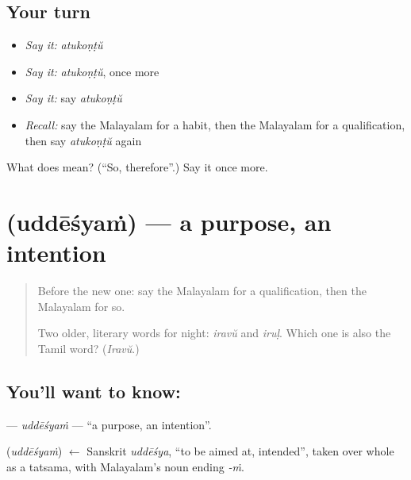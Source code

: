 \subsection*{Your turn}
\begin{itemize}
\raggedright
  \item \emph{Say it:} \emph{atukoṇṭŭ}
  \item \emph{Say it:} \emph{atukoṇṭŭ}, once more
  \item \emph{Say it:} say \emph{atukoṇṭŭ}
  \item \emph{Recall:} say the Malayalam for a habit, then the Malayalam for a qualification, then say \emph{atukoṇṭŭ} again
\end{itemize}

\begin{tcolorbox}[breakable,colback=teal!4,colframe=teal!35!black,title={Before you move on}]
What does  mean? (\textquotedblleft{}So, therefore\textquotedblright{}.) Say it once more.
\end{tcolorbox}
\section[\texorpdfstring{\ml{ഉദ്ദേശ്യം} (uddēśyaṁ)}{ഉദ്ദേശ്യം (uddēśyaṁ)}]{ (uddēśyaṁ) — a purpose, an intention}

\label{lesson:ML-C144-uddesyam}



\begin{quote}
Before the new one: say the Malayalam for a qualification, then the Malayalam for so.

Two older, literary words for night: \emph{iravŭ} and \emph{iruḷ}. Which one is also the Tamil word? (\emph{Iravŭ}.)
\end{quote}

\subsection*{You'll want to know: }
\textbf{} — \emph{uddēśyaṁ} — \textquotedblleft{}a purpose, an intention\textquotedblright{}.

\begin{cousinweb}
\textbf{} (\emph{uddēśyaṁ}) $\leftarrow$ Sanskrit \emph{uddēśya}, \textquotedblleft{}to be aimed at, intended\textquotedblright{}, taken over whole as a tatsama, with Malayalam's noun ending \emph{-ṁ}.
\end{cousinweb}

